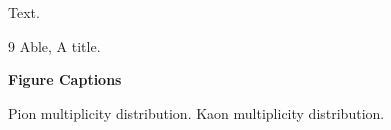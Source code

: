 \documentclass{article}
\begin{document}
Text.
\begin{thebibliography}{9}
 Able, A title.
\end{thebibliography}

\begin{center}
{\bf Figure Captions}
\end{center}
\begin{enumerate}
Pion multiplicity distribution.
Kaon multiplicity distribution.
\end{enumerate}
\end{document}
